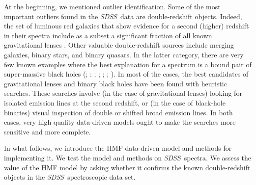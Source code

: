 \documentclass[12pt,preprint]{aastex}
\newcommand{\project}[1]{\textsl{#1}}
\newcommand{\sdss}{\project{SDSS}}
\begin{document}
At the beginning, we mentioned outlier identification.  Some of the
most important outliers found in the \sdss\ data are double-redshift
objects.  Indeed, the set of luminous red galaxies that show evidence
for a second (higher) redshift in their spectra include as a subset a
significant fraction of all known gravitational lenses \citep{bolton}.
Other valuable double-redshift sources include merging galaxies,
binary stars, and binary quasars.  In the latter category, there are
very few known examples where the best explanation for a spectrum is a
bound pair of super-massive black holes (\citealt{komossa};
\citealt{shields}: \citealt{boroson}; \citealt{decarli}; \citealt{barrows11}; 
\citealt{eracleous}; \citealt{tsalmantza}).  In most of the cases, the best
candidates  of gravitational lenses and binary black holes have been 
found with heuristic searches.  These searches
involve (in the case of gravitational lenses) looking for isolated
emission lines at the second redshift, or (in the case of black-hole
binaries) visual inspection of double or shifted broad emission lines.
In both cases, very high quality data-driven models ought to make the
searches more sensitive and more complete.

In what follows, we introduce the HMF data-driven model and methods
for implementing it.  We test the model and methods on \sdss\ spectra.
We assess the value of the HMF model by asking whether it confirms the
known double-redshift objects in the \sdss\ spectroscopic data set.
\end{document}
